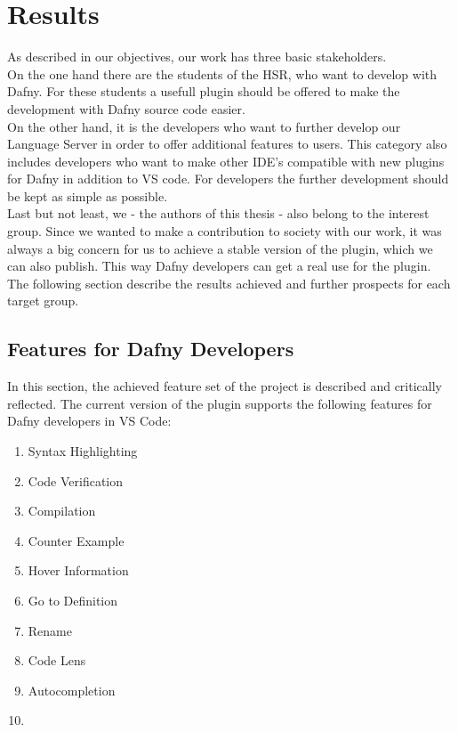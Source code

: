 \section{Results}
\label{section:results}


As described in our objectives, our work has three basic stakeholders. \\

On the one hand there are the students of the HSR, who want to develop with Dafny.
For these students a usefull plugin should be offered to make the development with Dafny source code easier. \\

On the other hand, it is the developers who want to further develop our Language Server in order to offer additional features to users.
This category also includes developers who want to make other IDE's compatible with new plugins for Dafny in addition to VS code.
For developers the further development should be kept as simple as possible. \\

Last but not least, we - the authors of this thesis - also belong to the interest group.
Since we wanted to make a contribution to society with our work,
it was always a big concern for us to achieve a stable version of the plugin, which we can also publish.
This way Dafny developers can get a real use for the plugin. \\

The following section describe the results achieved and further prospects for each target group.

\subsection{Features for Dafny Developers}
In this section, the achieved feature set of the project is described and critically reflected.
The current version of the plugin supports the following features for Dafny developers in VS Code:
\begin{enumerate}
    \item Syntax Highlighting
    \item Code Verification
    \item Compilation
    \item Counter Example
    \item Hover Information
    \item Go to Definition
    \item Rename
    \item Code Lens
    \item Autocompletion
    \item  {}
\end{enumerate}


